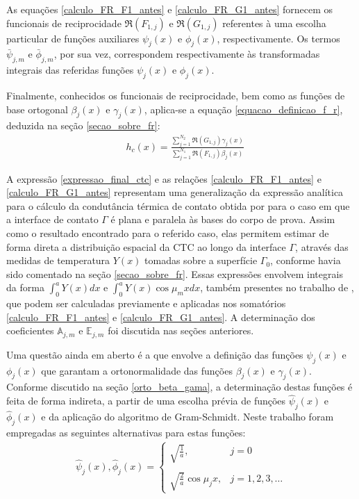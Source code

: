 As equações \eqref{calculo_FR_F1_antes} e \eqref{calculo_FR_G1_antes} fornecem os funcionais de reciprocidade $\Re(F_{1,j})$ e $\Re(G_{1,j})$ referentes à uma escolha particular de funções auxiliares $\psi_j(x)$ e $\phi_j(x)$, respectivamente. Os termos $\bar{\psi}_{j, m}$ e $\bar{\phi}_{j, m}$, por sua vez, correspondem respectivamente às transformadas integrais das referidas funções $\psi_j(x)$ e $\phi_j(x)$. 

Finalmente, conhecidos os funcionais de reciprocidade, bem como as funções de base ortogonal $\beta_j(x)$ e $\gamma_j(x)$, aplica-se a equação \eqref{equacao_definicao_f_r}, deduzida na seção \ref{secao_sobre_fr}:
\begin{align}
& h_c(x) %
= \frac{\displaystyle\sum_{j=1}^{N_2} \Re(G_{1,j}) \gamma_j(x)}{\displaystyle\sum_{j=1}^{N_1} \Re(F_{1,j}) \beta_j(x)} \label{expressao_final_ctc}
\end{align}

A expressão \eqref{expressao_final_ctc} e as relações \eqref{calculo_FR_F1_antes} e \eqref{calculo_FR_G1_antes} representam uma generalização da expressão analítica para o cálculo da condutância térmica de contato obtida por \cite{tese_padilha} para o caso em que a interface de contato $\Gamma$ é plana e paralela às bases do corpo de prova. Assim como o resultado encontrado para o referido caso, elas permitem estimar de forma direta a distribuição espacial da CTC ao longo da interface $\Gamma$, através das medidas de temperatura $Y(x)$ tomadas sobre a superfície $\Gamma_0$, conforme havia sido comentado na seção \ref{secao_sobre_fr}. Essas expressões envolvem integrais da forma $\displaystyle \int_0^a Y(x)dx$ e $\displaystyle \int_0^a Y(x)\cos\mu_m x dx$, também presentes no trabalho de \cite{tese_padilha}, que podem ser calculadas previamente e aplicadas nos somatórios \eqref{calculo_FR_F1_antes} e \eqref{calculo_FR_G1_antes}. A determinação dos coeficientes $\mathbb{A}_{j,m}$ e $\mathbb{E}_{j,m}$ foi discutida nas seções anteriores.

Uma questão ainda em aberto é a que envolve a definição das funções $\psi_j(x)$ e $\phi_j(x)$ que garantam a ortonormalidade das funções $\beta_j(x)$ e $\gamma_j(x)$. Conforme discutido na seção \ref{orto_beta_gama}, a determinação destas funções é feita de forma indireta, a partir de uma escolha prévia de funções $\hat{\psi}_j(x)$ e $\hat{\phi}_j(x)$ e da aplicação do algoritmo de Gram-Schmidt. Neste trabalho foram empregadas as seguintes alternativas para estas funções:
\begin{align}
\hat{\psi}_j(x), \hat{\phi}_j(x) = \left\lbrace
\begin{array}{ll}
\displaystyle\sqrt{\frac{1}{a}}, & j = 0 \\ \nonumber \\
\displaystyle\sqrt{\frac{2}{a}}\cos \mu_j x, & j = 1,2,3,\ldots
\end{array}
\right.
\end{align} 

